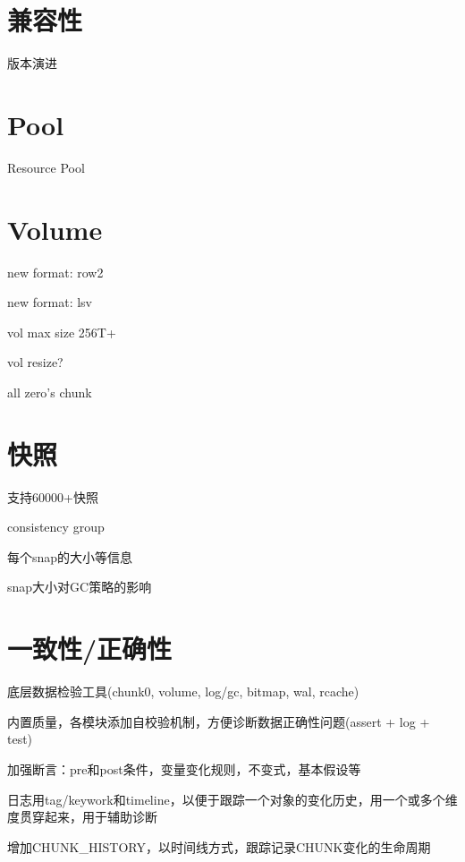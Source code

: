 \section{兼容性}

\begin{compactenum}
    \item 版本演进
\end{compactenum}

\section{Pool}

\begin{compactenum}
    \item Resource Pool
\end{compactenum}

\section{Volume}

\begin{compactenum}
    \item new format: row2
    \item new format: lsv
    \item vol max size 256T+
    \item vol resize?
    \item all zero's chunk
\end{compactenum}

\section{快照}

\begin{compactenum}
    \item 支持60000+快照
    \item consistency group
    \item 每个snap的大小等信息
    \item snap大小对GC策略的影响
\end{compactenum}

\section{一致性/正确性}

\begin{tcolorbox}
\begin{compactenum}
    \item 底层数据检验工具(chunk0, volume, log/gc, bitmap, wal, rcache)
    \item 内置质量，各模块添加自校验机制，方便诊断数据正确性问题(assert + log + test)
    \item 加强断言：pre和post条件，变量变化规则，不变式，基本假设等
    \item 日志用tag/keywork和timeline，以便于跟踪一个对象的变化历史，用一个或多个维度贯穿起来，用于辅助诊断
    \item 增加CHUNK\_HISTORY，以时间线方式，跟踪记录CHUNK变化的生命周期
\end{compactenum}
\end{tcolorbox}

